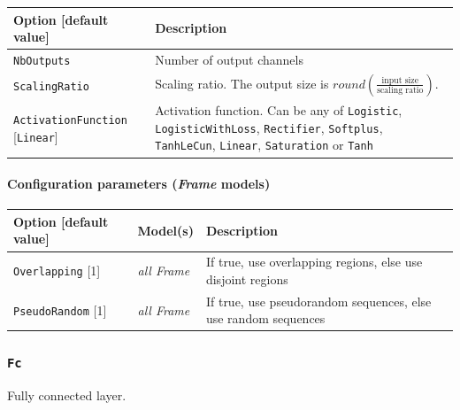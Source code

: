 \documentclass[a4paper,11pt,oneside]{article}
\begin{document}
\begin{center}
 \begin{longtable}{| p{5cm} | p{10cm} | }
 \hline
 Option [default value] & Description\\
 \hline\hline
  \cellcolor{requiredcolor}\lstinline!NbOutputs! & Number of output channels \\
  \cellcolor{requiredcolor}\lstinline!ScalingRatio! & Scaling ratio.
  The output size is $round\left(\frac{\text{input size}}
  {\text{scaling ratio}}\right)$. \\
  \lstinline!ActivationFunction! [\lstinline!Linear!] & Activation function.
  Can be any of \lstinline!Logistic!,  \lstinline!LogisticWithLoss!,
  \lstinline!Rectifier!, \lstinline!Softplus!, \lstinline!TanhLeCun!,
  \lstinline!Linear!, \lstinline!Saturation! or \lstinline!Tanh! \\
 \hline
\end{longtable}
\end{center}

\paragraph{Configuration parameters (\emph{Frame} models)}

\begin{center}
 \begin{longtable}{| p{4cm} | p{3cm} | p{9cm} | }
 \hline
 Option [default value] & Model(s) & Description\\
 \hline\hline
  \lstinline!Overlapping! [1] & \emph{all Frame} & If true, use overlapping
  regions, else use disjoint regions \\
  \lstinline!PseudoRandom! [1] & \emph{all Frame} & If true, use pseudorandom
  sequences, else use random sequences \\
 \hline
\end{longtable}
\end{center}


\subsubsection{\texorpdfstring{%
\lstinline[basicstyle=\ttfamily\bfseries]!Fc!}{Fc}}
Fully connected layer.
\end{document}
